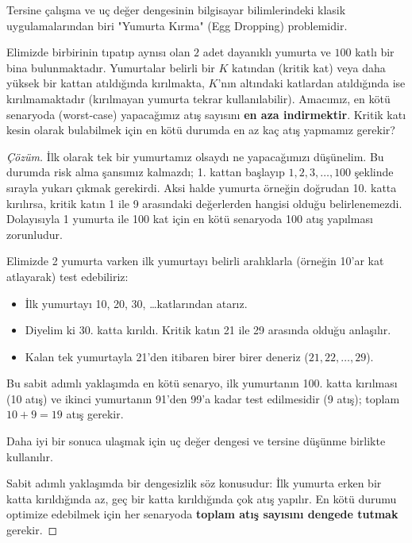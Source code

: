 Tersine çalışma ve uç değer dengesinin bilgisayar bilimlerindeki klasik uygulamalarından biri "Yumurta Kırma" (Egg Dropping) problemidir.

\begin{example}
Elimizde birbirinin tıpatıp aynısı olan $2$ adet dayanıklı yumurta ve $100$ katlı bir bina bulunmaktadır. Yumurtalar belirli bir $K$ katından (kritik kat) veya daha yüksek bir kattan atıldığında kırılmakta, $K$'nın altındaki katlardan atıldığında ise kırılmamaktadır (kırılmayan yumurta tekrar kullanılabilir). Amacımız, en kötü senaryoda (worst-case) yapacağımız atış sayısını \textbf{en aza indirmektir}. Kritik katı kesin olarak bulabilmek için en kötü durumda en az kaç atış yapmamız gerekir?
\end{example}

\begin{proof}[Çözüm]
İlk olarak tek bir yumurtamız olsaydı ne yapacağımızı düşünelim. Bu durumda risk alma şansımız kalmazdı; 1. kattan başlayıp $1, 2, 3, \dots, 100$ şeklinde sırayla yukarı çıkmak gerekirdi. Aksi halde yumurta örneğin doğrudan 10. katta kırılırsa, kritik katın 1 ile 9 arasındaki değerlerden hangisi olduğu belirlenemezdi. Dolayısıyla 1 yumurta ile 100 kat için en kötü senaryoda 100 atış yapılması zorunludur.

Elimizde 2 yumurta varken ilk yumurtayı belirli aralıklarla (örneğin 10'ar kat atlayarak) test edebiliriz:
\begin{itemize}
    \item İlk yumurtayı 10, 20, 30, \dots katlarından atarız.
    \item Diyelim ki 30. katta kırıldı. Kritik katın 21 ile 29 arasında olduğu anlaşılır.
    \item Kalan tek yumurtayla 21'den itibaren birer birer deneriz ($21, 22, \dots, 29$).
\end{itemize}
Bu sabit adımlı yaklaşımda en kötü senaryo, ilk yumurtanın 100. katta kırılması (10 atış) ve ikinci yumurtanın 91'den 99'a kadar test edilmesidir (9 atış); toplam $10 + 9 = 19$ atış gerekir.

Daha iyi bir sonuca ulaşmak için uç değer dengesi ve tersine düşünme birlikte kullanılır.

Sabit adımlı yaklaşımda bir dengesizlik söz konusudur: İlk yumurta erken bir katta kırıldığında az, geç bir katta kırıldığında çok atış yapılır. En kötü durumu optimize edebilmek için her senaryoda \textbf{toplam atış sayısını dengede tutmak} gerekir.


\end{proof}
